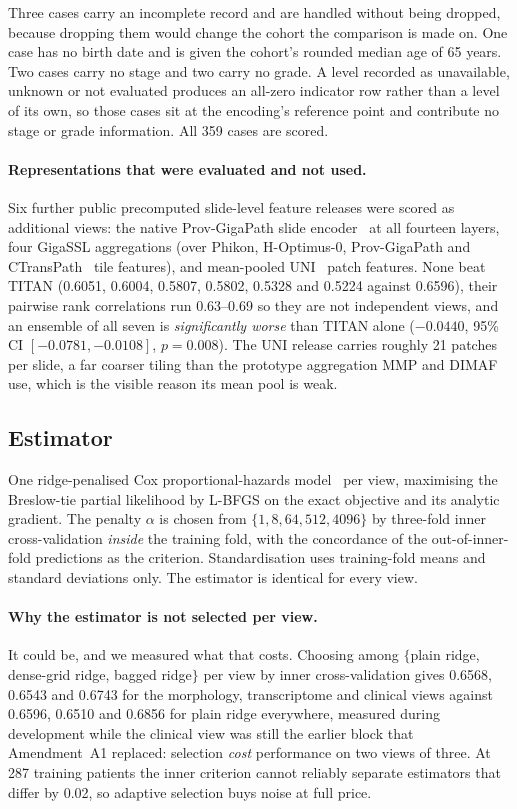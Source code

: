 \documentclass[unnumsec,webpdf,contemporary,large]{oup-authoring-template}
\begin{document}
Three cases carry an incomplete record and are handled without being dropped, because dropping them
would change the cohort the comparison is made on. One case has no birth date and is given the
cohort's rounded median age of 65 years. Two cases carry no stage and two carry no grade. A level
recorded as unavailable, unknown or not evaluated produces an all-zero indicator row rather than a
level of its own, so those cases sit at the encoding's reference point and contribute no stage or
grade information. All 359 cases are scored.

\paragraph{Representations that were evaluated and not used.} Six further public precomputed
slide-level feature releases were scored as additional views: the native Prov-GigaPath slide
encoder~\citep{xu2024provgigapath} at all fourteen layers, four GigaSSL aggregations (over Phikon,
H-Optimus-0, Prov-GigaPath and CTransPath~\citep{wang2022ctranspath} tile features), and mean-pooled
UNI~\citep{chen2024uni} patch features. None beat TITAN (0.6051, 0.6004, 0.5807, 0.5802, 0.5328 and
0.5224 against 0.6596), their pairwise rank correlations run 0.63--0.69 so they are not independent
views, and an ensemble of all seven is \emph{significantly worse} than TITAN alone ($-0.0440$, 95\%
CI $[-0.0781,-0.0108]$, $p=0.008$). The UNI release carries roughly 21 patches per slide, a far
coarser tiling than the prototype aggregation MMP and DIMAF use, which is the visible reason its
mean pool is weak.

\subsection{Estimator}

One ridge-penalised Cox proportional-hazards model~\citep{cox1972regression,simon2011regularization}
per view, maximising the Breslow-tie partial likelihood by L-BFGS on the exact objective and its
analytic gradient. The penalty $\alpha$ is chosen from $\{1, 8, 64, 512, 4096\}$ by three-fold
inner cross-validation \emph{inside} the training fold, with the concordance of the
out-of-inner-fold predictions as the criterion. Standardisation uses training-fold means and
standard deviations only. The estimator is identical for every view.

\paragraph{Why the estimator is not selected per view.} It could be, and we measured what that
costs. Choosing among $\{$plain ridge, dense-grid ridge, bagged ridge$\}$ per view by inner
cross-validation gives 0.6568, 0.6543 and 0.6743 for the morphology, transcriptome and clinical
views against 0.6596, 0.6510 and 0.6856 for plain ridge everywhere, measured during development
while the clinical view was still the earlier block that Amendment~A1 replaced: selection
\emph{cost} performance on two views of three. At 287 training patients the inner criterion cannot reliably
separate estimators that differ by 0.02, so adaptive selection buys noise at full price.
\end{document}
